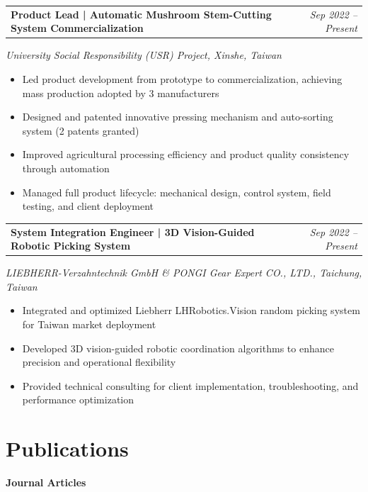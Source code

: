 \documentclass[11pt,a4paper]{article}
\makeatletter
\newcommand{\resumeProjectHeading}[2]{
    \vspace{2pt}
    \begin{tabular*}{\textwidth}[t]{@{}l@{\extracolsep{\fill}}r@{}}
        \textbf{#1} & \textit{\small#2} \\
    \end{tabular*}\vspace{-5pt}
}
\newcommand{\resumeItem}[1]{
    \item\small{#1 \vspace{-2pt}}
}
\makeatother
\begin{document}
\vspace{4pt}

\resumeProjectHeading
{\textbf{Product Lead} | Automatic Mushroom Stem-Cutting System Commercialization}{Sep 2022 -- Present}
\textit{University Social Responsibility (USR) Project, Xinshe, Taiwan}
\vspace{2pt}
\begin{itemize}[leftmargin=*, itemsep=1pt]
    \resumeItem{Led product development from prototype to commercialization, achieving mass production adopted by 3 manufacturers}
    \resumeItem{Designed and patented innovative pressing mechanism and auto-sorting system (2 patents granted)}
    \resumeItem{Improved agricultural processing efficiency and product quality consistency through automation}
    \resumeItem{Managed full product lifecycle: mechanical design, control system, field testing, and client deployment}
\end{itemize}

\vspace{4pt}

\resumeProjectHeading
{\textbf{System Integration Engineer} | 3D Vision-Guided Robotic Picking System}{Sep 2022 -- Present}
\textit{LIEBHERR-Verzahntechnik GmbH \& PONGI Gear Expert CO., LTD., Taichung, Taiwan}
\vspace{2pt}
\begin{itemize}[leftmargin=*, itemsep=1pt]
    \resumeItem{Integrated and optimized Liebherr LHRobotics.Vision random picking system for Taiwan market deployment}
    \resumeItem{Developed 3D vision-guided robotic coordination algorithms to enhance precision and operational flexibility}
    \resumeItem{Provided technical consulting for client implementation, troubleshooting, and performance optimization}
\end{itemize}

\pagebreak

\section{Publications}
\vspace{2pt}

\textbf{Journal Articles}
\vspace{2pt}
\end{document}
